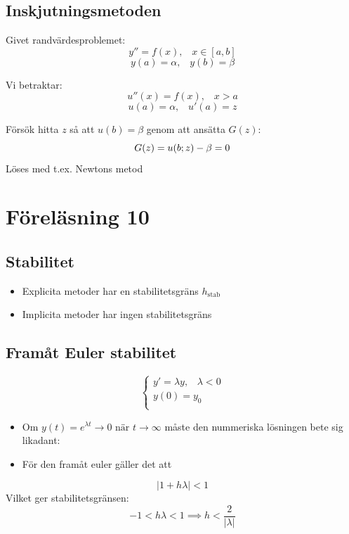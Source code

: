 \documentclass[a4paper,11pt]{article}
\begin{document}
\subsection{Inskjutningsmetoden}
Givet randvärdesproblemet:
$$y'' = f(x), \hspace{10pt} x \in [a, b]$$
$$y(a) = \alpha, \hspace{10pt} y(b) = \beta$$ 

Vi betraktar: 
$$u''(x) = f(x), \hspace{10pt}x > a$$
$$u(a) = \alpha, \hspace{10pt} u'(a) = z$$

Försök hitta $z$ så att $u(b) = \beta$ genom att ansätta $G(z)$:
\[
G(z) = u(b; z) - \beta = 0 \\
\]
Löses med t.ex. Newtons metod

\section{Föreläsning 10}
\subsection{Stabilitet}
\begin{itemize}
    \item Explicita metoder har en stabilitetsgräns $h_{\text{stab}}$
    \item Implicita metoder har ingen stabilitetsgräns
\end{itemize}

\subsection{Framåt Euler stabilitet}
\[
\begin{cases}
    y' = \lambda y, \hspace{10pt} \lambda < 0 \\
    y(0) = y_0 \\
\end{cases}
\]
\begin{itemize}
    \item Om $y(t) = e^{\lambda t} \rightarrow 0 \text{ när } t \rightarrow \infty$ måste den nummeriska lösningen bete sig likadant:
    \item För den framåt euler gäller det att
\end{itemize}
\[
|1 + h \lambda| < 1 
\]
Vilket ger stabilitetsgränsen:
\[-1 < h \lambda < 1 \implies h < \frac{2}{|\lambda|}\]
\end{document}
